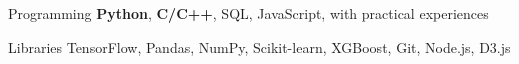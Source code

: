 


\begin{cvskills}


\cvskill
{Programming} %
{\textbf{Python}, \textbf{C/C++}, SQL, JavaScript, with practical experiences} %


\cvskill
{Libraries} %
{TensorFlow, Pandas, NumPy, Scikit-learn, XGBoost, Git, Node.js, D3.js} %



\end{cvskills}